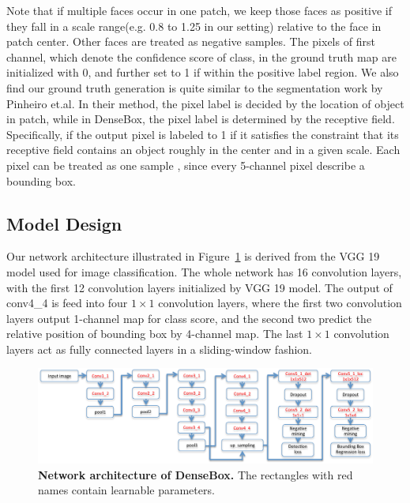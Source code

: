 Note that if multiple faces occur in one patch, we keep those faces as positive if they fall in a scale range(e.g. 0.8 to 1.25 in our setting) relative to the face in patch center. Other faces are treated as negative samples. The pixels of first channel, which denote the confidence score of class, in the ground truth map are initialized with 0, and further set to 1 if within the positive label region.  We also find our ground truth generation is quite similar to the segmentation work\cite{pinheiro2015learning} by Pinheiro et.al.   In their method, the pixel label is decided by the location of object in patch, while in DenseBox, the pixel label is determined by the receptive field. Specifically, if the output pixel is labeled to 1 if it satisfies the constraint that its receptive field contains an object roughly in the center and in a given scale. Each pixel can be treated as one sample , since every 5-channel pixel describe a bounding box.


\subsection{Model Design } 

Our network architecture illustrated in Figure~\ref{fig:fig_net} is derived from the VGG 19 model used for image classification\cite{simonyan2014very}. The whole network has 16 convolution layers, with the first 12 convolution layers initialized by VGG 19 model.  The output of conv4\_4 is feed into four $1 \times 1$ convolution layers, where the first two convolution layers output 1-channel map for class score, and the second two predict the relative position of bounding box by 4-channel map.  The last $1 \times 1$ convolution layers act as fully connected layers in a sliding-window fashion.  


	\begin{figure}[!hbtp]
	\centering
	 \includegraphics[scale=0.55]{figures/figure3-crop.pdf}
	\caption{\textbf{Network architecture of DenseBox.} The rectangles with red names contain learnable parameters. }
	\label{fig:fig_net}
	\end{figure}



